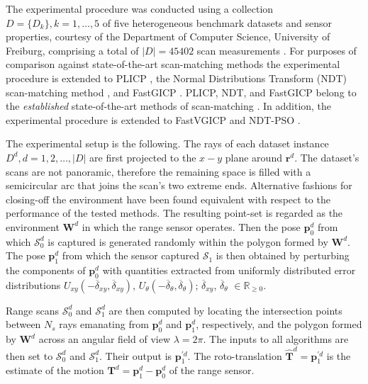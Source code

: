 The experimental procedure was conducted using a collection $D = \{D_k\}, k =
1,\dots,5$ of five heterogeneous benchmark datasets and sensor properties,
courtesy of the Department of Computer Science, University of Freiburg,
comprising a total of $|D| = 45402$ scan measurements \cite{datasets_link}.
For purposes of comparison against state-of-the-art scan-matching methods the
experimental procedure is extended to PLICP \cite{Censi2008b}, the Normal
Distributions Transform (NDT) scan-matching method \cite{Biber}, and FastGICP
\cite{Segal2009}. PLICP, NDT, and FastGICP belong to the \textit{established}
state-of-the-art methods of scan-matching
\cite{Koide2021,Xu2018a,Sobreira2019a,Pishehvari2019a,Qingshan2019a,Pham2021a}.
In addition, the experimental procedure is extended to FastVGICP
\cite{Pham2021a} and NDT-PSO \cite{Bouraine2020}.

The experimental setup is the following. The rays of each dataset instance
$D^d, d = 1,2,\dots,|D|$ are first projected to the $x-y$ plane around
$\bm{r}^d$.  The dataset's scans are not panoramic, therefore the remaining
space is filled with a semicircular arc that joins the scan's two extreme ends.
Alternative fashions for closing-off the environment have been found equivalent
with respect to the performance of the tested methods. The resulting point-set
is regarded as the environment $\bm{W}^d$ in which the range sensor operates.
Then the pose $\bm{p}_0^d$ from which $\mathcal{S}_0^d$ is captured is
generated randomly within the polygon formed by $\bm{W}^d$. The pose
$\bm{p}_1^d$ from which the sensor captured $\mathcal{S}_1$ is then obtained by
perturbing the components of $\bm{p}_0^d$ with quantities extracted from
uniformly distributed error distributions $U_{xy}(-\overline{\delta}_{xy},
\overline{\delta}_{xy})$, $U_{\theta}(-\overline{\delta}_{\theta},
\overline{\delta}_{\theta})$; $\overline{\delta}_{xy}$,
$\overline{\delta}_\theta$ $\in \mathbb{R}_{\geq 0}$.

Range scans $\mathcal{S}_0^d$ and $\mathcal{S}_1^d$ are then computed by
locating the intersection points between $N_s$ rays emanating from $\bm{p}_0^d$
and $\bm{p}_1^d$, respectively, and the polygon formed by $\bm{W}^d$ across an
angular field of view $\lambda = 2\pi$. The inputs to all algorithms are
then set to $\mathcal{S}_0^d$ and $\mathcal{S}_1^d$. Their output is
$\bm{p}_1^{\prime d}$. The roto-translation
$\hat{\bm{T}}^d = \bm{p}_1^{\prime d}$ is the estimate of the motion
$\bm{T}^d = \bm{p}_1^d - \bm{p}_0^d$ of the range sensor.

